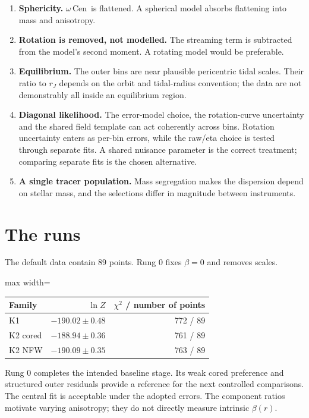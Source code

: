 \documentclass[11pt,a4paper]{article}
\newcommand{\ocen}{$\omega$\,Cen}
\begin{document}
\begin{enumerate}
\item \textbf{Sphericity.} \ocen\ is flattened. A spherical model absorbs flattening into
      mass and anisotropy.
\item \textbf{Rotation is removed, not modelled.} The streaming term is subtracted from the
      model's second moment. A rotating model would be preferable.
\item \textbf{Equilibrium.} The outer bins are near plausible pericentric tidal scales.
      Their ratio to $r_J$ depends on the orbit and tidal-radius convention; the data are
      not demonstrably all inside an equilibrium region.
\item \textbf{Diagonal likelihood.} The error-model choice, the rotation-curve uncertainty and
      the shared field template can act coherently across bins. Rotation uncertainty enters
      as per-bin errors, while the raw/eta choice is tested through separate fits. A shared nuisance parameter is the correct treatment; comparing separate
      fits is the chosen alternative.
\item \textbf{A single tracer population.} Mass segregation makes the dispersion depend on
      stellar mass, and the selections differ in magnitude between instruments.
\end{enumerate}

\section{The runs}

The default data contain 89 points. Rung 0 fixes $\beta=0$ and removes scales.
\begin{center}
\begin{adjustbox}{max width=\linewidth}
\begin{tabular}{lrr}
\toprule
Family & $\ln Z$ & $\chi^2$ / number of points\\
\midrule
K1 & $-190.02\pm0.48$ & 772 / 89\\
K2 cored & $-188.94\pm0.36$ & 761 / 89\\
K2 NFW & $-190.09\pm0.35$ & 763 / 89\\
\bottomrule
\end{tabular}
\end{adjustbox}
\end{center}
Rung 0 completes the intended baseline stage. Its weak cored preference and structured
outer residuals provide a reference for the next controlled comparisons. The central fit
is acceptable under the adopted errors. The component ratios motivate varying anisotropy;
they do not directly measure intrinsic $\beta(r)$.
\end{document}
